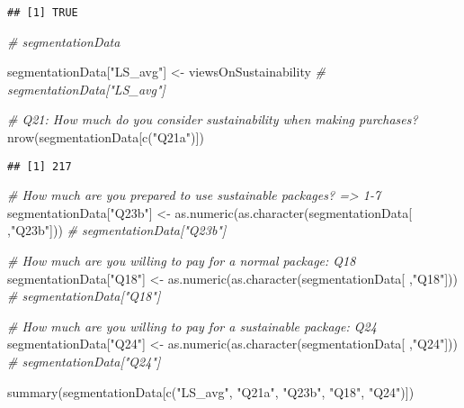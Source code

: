 \documentclass[
]{article}
\newenvironment{Shaded}{\begin{snugshade}}{\end{snugshade}}
\newcommand{\CommentTok}[1]{\textcolor[rgb]{0.56,0.35,0.01}{\textit{#1}}}
\newcommand{\FunctionTok}[1]{\textcolor[rgb]{0.00,0.00,0.00}{#1}}
\newcommand{\NormalTok}[1]{#1}
\newcommand{\OtherTok}[1]{\textcolor[rgb]{0.56,0.35,0.01}{#1}}
\newcommand{\StringTok}[1]{\textcolor[rgb]{0.31,0.60,0.02}{#1}}
\begin{document}
\begin{verbatim}
## [1] TRUE
\end{verbatim}

\begin{Shaded}
\begin{Highlighting}[]
\CommentTok{\# segmentationData}

\NormalTok{segmentationData[}\StringTok{"LS\_avg"}\NormalTok{] }\OtherTok{\textless{}{-}}\NormalTok{ viewsOnSustainability}
\CommentTok{\# segmentationData["LS\_avg"]}

\CommentTok{\# Q21: How much do you consider sustainability when making purchases? }
\FunctionTok{nrow}\NormalTok{(segmentationData[}\FunctionTok{c}\NormalTok{(}\StringTok{"Q21a"}\NormalTok{)])}
\end{Highlighting}
\end{Shaded}

\begin{verbatim}
## [1] 217
\end{verbatim}

\begin{Shaded}
\begin{Highlighting}[]
\CommentTok{\# How much are you prepared to use sustainable packages? =\textgreater{} 1{-}7}
\NormalTok{segmentationData[}\StringTok{"Q23b"}\NormalTok{] }\OtherTok{\textless{}{-}} \FunctionTok{as.numeric}\NormalTok{(}\FunctionTok{as.character}\NormalTok{(segmentationData[ ,}\StringTok{"Q23b"}\NormalTok{]))}
\CommentTok{\# segmentationData["Q23b"]}

\CommentTok{\# How much are you willing to pay for a normal package: Q18}
\NormalTok{segmentationData[}\StringTok{"Q18"}\NormalTok{] }\OtherTok{\textless{}{-}} \FunctionTok{as.numeric}\NormalTok{(}\FunctionTok{as.character}\NormalTok{(segmentationData[ ,}\StringTok{"Q18"}\NormalTok{]))}
\CommentTok{\# segmentationData["Q18"]}

\CommentTok{\# How much are you willing to pay for a sustainable package: Q24 }
\NormalTok{segmentationData[}\StringTok{"Q24"}\NormalTok{] }\OtherTok{\textless{}{-}} \FunctionTok{as.numeric}\NormalTok{(}\FunctionTok{as.character}\NormalTok{(segmentationData[ ,}\StringTok{"Q24"}\NormalTok{]))}
\CommentTok{\# segmentationData["Q24"]}


\FunctionTok{summary}\NormalTok{(segmentationData[}\FunctionTok{c}\NormalTok{(}\StringTok{"LS\_avg"}\NormalTok{, }\StringTok{"Q21a"}\NormalTok{, }\StringTok{"Q23b"}\NormalTok{, }\StringTok{"Q18"}\NormalTok{, }\StringTok{"Q24"}\NormalTok{)])}
\end{Highlighting}
\end{Shaded}
\end{document}
